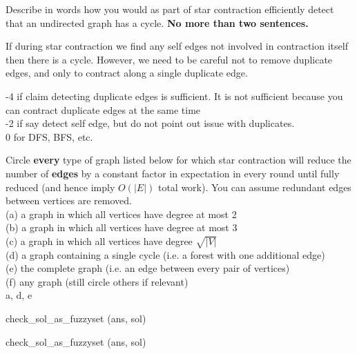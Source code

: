 %

\begin{problem}
\ask
Describe in words how you would as part of star contraction 
efficiently detect that an undirected graph has a cycle.  \textbf{No more than two sentences.}

\sol
If during star contraction we find any self edges not involved in
contraction itself then there is a cycle.   However,
we need to be careful not to remove duplicate edges, and only to
contract along a single duplicate edge.

-4 if claim detecting duplicate edges is sufficient.  It is not sufficient because you can contract duplicate edges at the same time\\
%
-2 if say detect self edge, but do not point out issue with duplicates.\\
%
0 for DFS, BFS, etc.
\end{problem}


%
%
\begin{problem}
\ask
Circle \textbf{every} type of graph listed below for which star
contraction will reduce the number of \textbf{edges} by a constant
factor in expectation in every round until fully reduced (and hence
imply $O(|E|)$ total work).  You can assume redundant edges between
vertices are removed.\\

(a) a graph in which all vertices have degree at most 2\\
(b) a graph in which all vertices have degree at most 3\\
(c) a graph in which all vertices have degree $\sqrt{|V|}$\\
(d) a graph containing a single cycle (i.e. a forest with one additional edge)\\
(e) the complete graph (i.e. an edge between every pair of vertices)\\
(f) any graph (still circle others if relevant)\\

\sol
a, d, e

\algoc
check_sol_as_fuzzyset (ans, sol)

\algog
check_sol_as_fuzzyset (ans, sol)

\end{problem}


